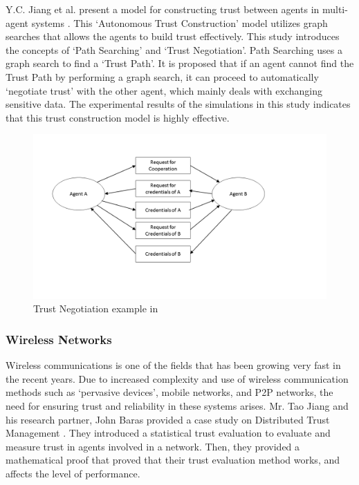 \documentclass[runningheads,a4paper]{llncs}
\begin{document}
Y.C. Jiang et al. present a model for constructing trust between agents in multi-agent systems \cite{jiang2005autonomous}. This `Autonomous Trust Construction' model utilizes graph searches that allows the agents to build trust effectively. This study introduces the concepts of `Path Searching' and `Trust Negotiation'. Path Searching uses a graph search to find a `Trust Path'. It is proposed that if an agent cannot find the Trust Path by performing a graph search, it can proceed to automatically `negotiate trust' with the other agent, which mainly deals with exchanging sensitive data. The experimental results of the simulations in this study indicates that this trust construction model is highly effective.

\begin{figure}
	\centering
		\includegraphics[width=\textwidth]{Figures/TrustNegotiation.png}
	\caption{Trust Negotiation example in \cite{jiang2005autonomous}}
\end{figure}


\subsubsection{Wireless Networks}
Wireless communications is one of the fields that has been growing very fast in the recent years. Due to increased complexity and use of wireless communication methods such as `pervasive devices', mobile networks, and P2P networks, the need for ensuring trust and reliability in these systems arises. Mr. Tao Jiang and his research partner, John Baras provided a case study on Distributed Trust Management \cite{jiang2006trust}. They introduced a statistical trust evaluation to evaluate and measure trust in agents involved in a network. Then, they provided a mathematical proof that proved that their trust evaluation method works, and affects the level of performance.
\end{document}
